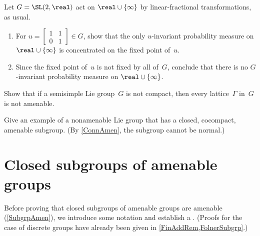 \begin{exercises}
\item \label{NoProbMeasOnRP1}
Let $G = \SL(2,\real)$ act on $\real \cup \{\infty\}$ by linear-fractional transformations, as usual.
\noprelistbreak
	\begin{enumerate}
	\item \label{NoProbMeasOnRP1-u}
 For 
		$ u = \left[\begin{smallmatrix} 1 & 1 \\ 0 & 1 \end{smallmatrix} \right] \in G $,
	show that the only $u$-invariant probability measure on $\real \cup \{\infty\}$ is concentrated on the fixed point of~$u$.
	\item Since the fixed point of~$u$ is not fixed by all of~$G$, conclude that there is no $G$-invariant probability measure on $\real \cup \{\infty\}$.
	\end{enumerate}

\item \label{GammaNotAmen}
Show that if a semisimple Lie group~$G$ is not compact, then every lattice~$\Gamma$ in~$G$ is not amenable.


\item Give an example of a nonamenable Lie group that has a closed, cocompact, amenable subgroup. (By \cref{ConnAmen}, the subgroup cannot be normal.)


\end{exercises}










\section{Closed subgroups of amenable groups}
\label{AmenSubgrpSect}

Before proving that closed subgroups  of amenable groups  are amenable (\cref{SubgrpAmen}), we introduce some notation and establish a . (Proofs for the case of discrete groups have already been given in \cref{FinAddRem,FolnerSubgrp}.)

